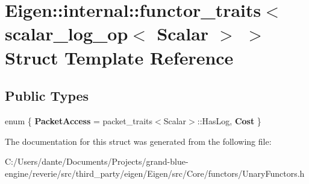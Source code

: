 \hypertarget{struct_eigen_1_1internal_1_1functor__traits_3_01scalar__log__op_3_01_scalar_01_4_01_4}{}\section{Eigen\+::internal\+::functor\+\_\+traits$<$ scalar\+\_\+log\+\_\+op$<$ Scalar $>$ $>$ Struct Template Reference}
\label{struct_eigen_1_1internal_1_1functor__traits_3_01scalar__log__op_3_01_scalar_01_4_01_4}
\subsection*{Public Types}
\begin{DoxyCompactItemize}
\item 
\mbox{\label{struct_eigen_1_1internal_1_1functor__traits_3_01scalar__log__op_3_01_scalar_01_4_01_4_a6955d3ee2c5a628eb1270012fe163e2a}} 
enum \{ {\bfseries Packet\+Access} = packet\+\_\+traits$<$Scalar$>$\+::Has\+Log, 
{\bfseries Cost}
 \}
\end{DoxyCompactItemize}


The documentation for this struct was generated from the following file\+:\begin{DoxyCompactItemize}
\item 
C\+:/\+Users/dante/\+Documents/\+Projects/grand-\/blue-\/engine/reverie/src/third\+\_\+party/eigen/\+Eigen/src/\+Core/functors/Unary\+Functors.\+h\end{DoxyCompactItemize}
